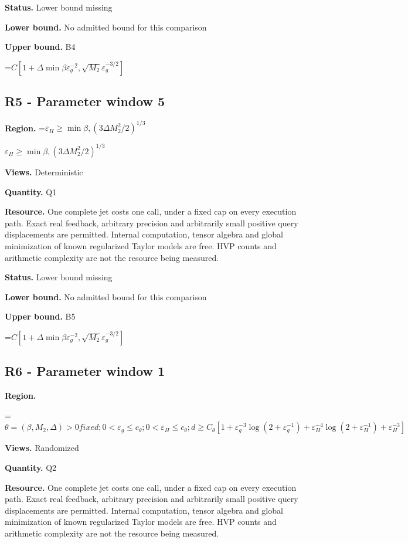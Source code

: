 \documentclass[10pt,a4paper]{article}
\newcommand{\AtlasMath}[1]{\par\begingroup\centering\setbox0=\hbox{$\displaystyle #1$}\ifdim\wd0>1.4\linewidth\typeout{ATLAS WIDE FORMULA: \the\wd0}\fi\ifdim\wd0>\linewidth\resizebox{\linewidth}{!}{\box0}\else\box0\fi\par\endgroup}
\newcommand{\AtlasInlineMath}[1]{\begingroup\setbox0=\hbox{$#1$}\ifdim\wd0>.4\linewidth\endgroup\AtlasMath{#1}\else\endgroup$#1$\fi}
\begin{document}
\textbf{Status.} Lower bound missing

\textbf{Lower bound.} No admitted bound for this comparison

\textbf{Upper bound.} B4

\AtlasMath{C[1+\Delta \min{\beta\varepsilon_g^{-2},\sqrt{M_2}\varepsilon_g^{-3/2}}]}
\subsection{R5 - Parameter window 5}
\textbf{Region.} \AtlasInlineMath{\varepsilon_H\ge \min{\beta,(3\Delta M_2^2/2)^{1/3}}}

\textbf{Views.} Deterministic

\textbf{Quantity.} Q1

\textbf{Resource.} One complete jet costs one call, under a fixed cap on every execution path. Exact real feedback, arbitrary precision and arbitrarily small positive query displacements are permitted. Internal computation, tensor algebra and global minimization of known regularized Taylor models are free. HVP counts and arithmetic complexity are not the resource being measured.

\textbf{Status.} Lower bound missing

\textbf{Lower bound.} No admitted bound for this comparison

\textbf{Upper bound.} B5

\AtlasMath{C[1+\Delta \min{\beta\varepsilon_g^{-2},\sqrt{M_2}\varepsilon_g^{-3/2}}]}
\subsection{R6 - Parameter window 1}
\textbf{Region.} 
\AtlasMath{\theta=(\beta,M_2,\Delta)>0 fixed;0<\varepsilon_g\le c_\theta;0<\varepsilon_H\le c_\theta;d\ge C_\theta[1+\varepsilon_g^{-3}\log(2+\varepsilon_g^{-1})+\varepsilon_H^{-4}\log(2+\varepsilon_H^{-1})+\varepsilon_H^{-3}]}


\textbf{Views.} Randomized

\textbf{Quantity.} Q2

\textbf{Resource.} One complete jet costs one call, under a fixed cap on every execution path. Exact real feedback, arbitrary precision and arbitrarily small positive query displacements are permitted. Internal computation, tensor algebra and global minimization of known regularized Taylor models are free. HVP counts and arithmetic complexity are not the resource being measured.
\end{document}
